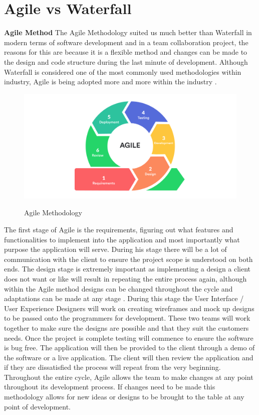 \section{Agile vs Waterfall }

\textbf{Agile Method}
\newline
The Agile Methodology suited us much better than Waterfall in modern terms of software development and in a team collaboration project, the reasons for this are because it is a flexible method and changes can be made to the design and code structure during the last minute of development. Although Waterfall is considered one of the most commonly used methodologies within industry, Agile is being adopted more and more within the industry \cite{waterfall}.

\begin{figure}[H]
  \centering
  \includegraphics[scale=0.35]{img/agile.jpg}
  \caption{Agile Methodology}\cite{agile}
  \label{fig:Agile Methodology}
\end{figure}

The first stage of Agile is the requirements, figuring out what features and functionalities to implement into the application and most importantly what purpose the application will serve. During his stage there will be a lot of communication with the client to ensure the project scope is understood on both ends. The design stage is extremely important as implementing a design a client does not want or like will result in repeating the entire process again, although within the Agile method designs can be changed throughout the cycle and adaptations can be made at any stage \cite{waterfall}. During this stage the User Interface / User Experience Designers will work on creating wireframes and mock up designs to be passed onto the programmers for development. These two teams will work together to make sure the designs are possible and that they suit the customers needs. Once the project is complete testing will commence to ensure the software is bug free. The application will then be provided to the client through a demo of the software or a live application. The client will then review the application and if they are dissatisfied the process will repeat from the very beginning. Throughout the entire cycle, Agile allows the team to make changes at any point throughout its development process. If changes need to be made this methodology allows for new ideas or designs to be brought to the table at any point of development. \cite{waterfall}

